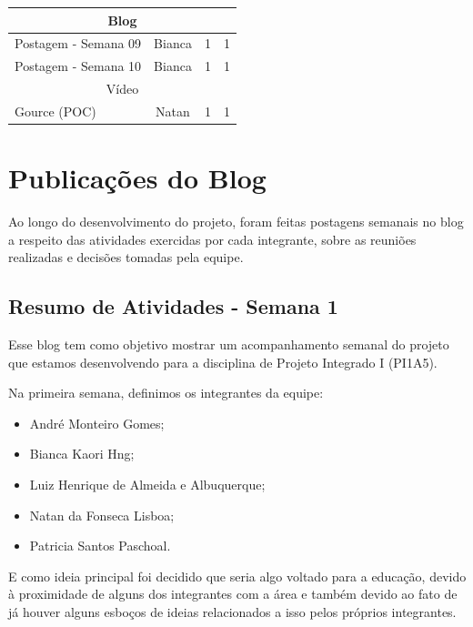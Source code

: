 \begin{apendicesenv}
\begin{quadro}[htb]
\begin{tabular}{|l|c|c|c|}
    \multicolumn{4}{|c|}{Blog} \\ \hline
    Postagem - Semana 09      & Bianca    & 1  & 1    \\ \hline
    Postagem - Semana 10      & Bianca     & 1 & 1   \\ \hline
    
    \multicolumn{4}{|c|}{Vídeo} \\ \hline
    Gource (POC) & Natan & 1  &  1  \\ \hline 
    
    
\end{tabular}
\end{quadro}
\FloatBarrier

\chapter{Publicações do Blog}

Ao longo do desenvolvimento do projeto, foram feitas postagens semanais no blog a respeito das atividades exercidas por cada integrante, sobre as reuniões realizadas e decisões tomadas pela equipe.

\section{Resumo de Atividades - Semana 1}

Esse blog tem como objetivo mostrar um acompanhamento semanal do projeto que estamos desenvolvendo para a disciplina de Projeto Integrado I (PI1A5).

Na primeira semana, definimos os integrantes da equipe:

\begin{itemize}
\item André Monteiro Gomes;
\item Bianca Kaori Hng;
\item Luiz Henrique de Almeida e Albuquerque;
\item Natan da Fonseca Lisboa;
\item Patricia Santos Paschoal.
\end{itemize}

E como ideia principal foi decidido que seria algo voltado para a educação, devido à proximidade de alguns dos integrantes com a área e também devido ao fato de já houver alguns esboços de ideias relacionados a isso pelos próprios integrantes. 


\end{apendicesenv}
